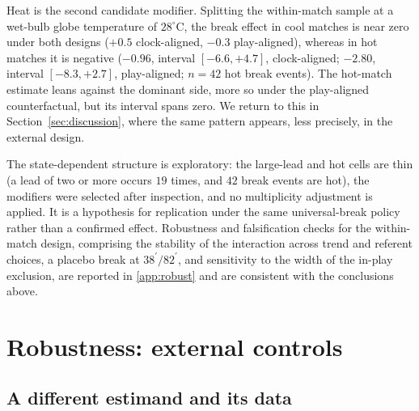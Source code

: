 \documentclass[11pt]{article}
\begin{document}
Heat is the second candidate modifier. Splitting the within-match sample at a wet-bulb globe temperature of
$28^\circ$C, the break effect in cool matches is near zero under both designs ($+0.5$ clock-aligned, $-0.3$
play-aligned), whereas in hot matches it is negative ($-0.96$, interval $[-6.6,+4.7]$, clock-aligned; $-2.80$,
interval $[-8.3,+2.7]$, play-aligned; $n=42$ hot break events). The hot-match estimate leans against the
dominant side, more so under the play-aligned counterfactual, but its interval spans zero. We return to this
in Section~\ref{sec:discussion}, where the same pattern appears, less precisely, in the external design.

The state-dependent structure is exploratory: the large-lead and hot cells are thin (a lead of two or more
occurs $19$ times, and $42$ break events are hot), the modifiers were selected after inspection, and no
multiplicity adjustment is applied. It is a hypothesis for replication under the same universal-break policy
rather than a confirmed effect. Robustness and falsification checks for the within-match design, comprising the
stability of the interaction across trend and referent choices, a placebo break at $38^\prime/82^\prime$, and
sensitivity to the width of the in-play exclusion, are reported in \ref{app:robust} and are consistent
with the conclusions above.

\section{Robustness: external controls}
\label{sec:external}

\subsection{A different estimand and its data}
\end{document}
